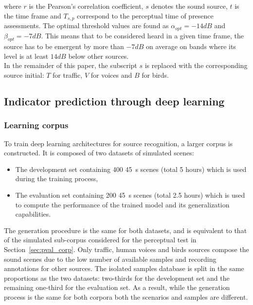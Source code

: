 \documentclass[11pt,a4paper]{article}
\begin{document}
where $r$ is the Pearson's correlation coefficient, $s$ denotes the sound source, $t$ is the time frame and $T_{s, p}$ correspond to the perceptual time of presence assessments. The optimal threshold values are found as $\alpha_{opt} = -14dB$ and $\beta_{opt} = -7dB$. This means that to be considered heard in a given time frame, the source has to be emergent by more than $-7dB$ on average on bands where its level is at least $14dB$ below other sources.\\

In the remainder of this paper, the subscript $s$ is replaced with the corresponding source initial: $T$ for traffic, $V$ for voices and $B$ for birds.




\subsection{Indicator prediction through deep learning}
\label{sec:deep}

\subsubsection{Learning corpus}
\label{sec:deep_corp}

To train deep learning architectures for source recognition, a larger corpus is constructed. It is composed of two datasets of simulated scenes:
\begin{itemize}
\item The development set containing 400 45~s scenes (total 5 hours) which is used during the training process,
\item The evaluation set containing 200 45~s scenes (total 2.5 hours) which is used to compute the performance of the trained model and its generalization capabilities.
\end{itemize}

The generation procedure is the same for both datasets, and is equivalent to that of the simulated sub-corpus considered for the perceptual test in Section~\ref{sec:pval_corp}. Only traffic, human voices and birds sources compose the sound scenes due to the low number of available samples and recording annotations for other sources. The isolated samples database is split in the same proportions as the two datasets: two-thirds for the development set and the remaining one-third for the evaluation set. As a result, while the generation process is the same for both corpora both the scenarios and samples are different.\\
\end{document}
